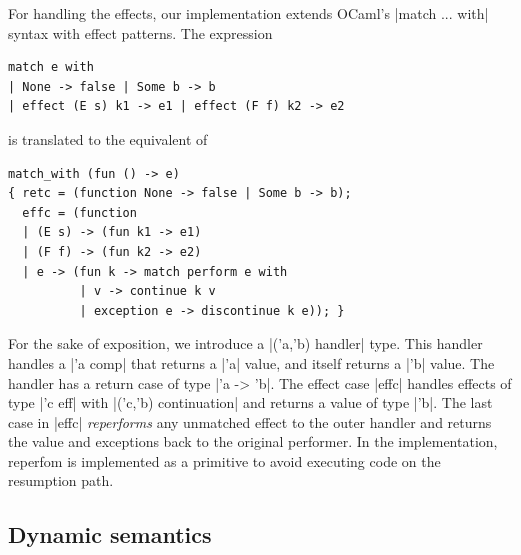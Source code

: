 \documentclass[sigplan,10pt,review,anonymous]{acmart}\settopmatter{printfolios=true,printccs=false,printacmref=false}
\begin{document}
For handling the effects, our implementation extends OCaml's |match ... with|
syntax with effect patterns. The expression
\begin{lstlisting}
match e with
| None -> false | Some b -> b
| effect (E s) k1 -> e1 | effect (F f) k2 -> e2
\end{lstlisting}
\noindent is translated to the equivalent of
\begin{lstlisting}
match_with (fun () -> e)
{ retc = (function None -> false | Some b -> b);
  effc = (function
  | (E s) -> (fun k1 -> e1)
  | (F f) -> (fun k2 -> e2)
  | e -> (fun k -> match perform e with
          | v -> continue k v
          | exception e -> discontinue k e)); }
\end{lstlisting}
For the sake of exposition, we introduce a |('a,'b) handler| type. This handler
handles a |'a comp| that returns a |'a| value, and itself returns a |'b| value.
The handler has a return case of type |'a -> 'b|. The effect case |effc|
handles effects of type |'c eff| with |('c,'b) continuation| and returns a
value of type |'b|. The last case in |effc| \emph{reperforms} any unmatched
effect to the outer handler and returns the value and exceptions back to the
original performer. In the implementation, reperfom is implemented as a
primitive to avoid executing code on the resumption path.

\subsection{Dynamic semantics}
\end{document}

